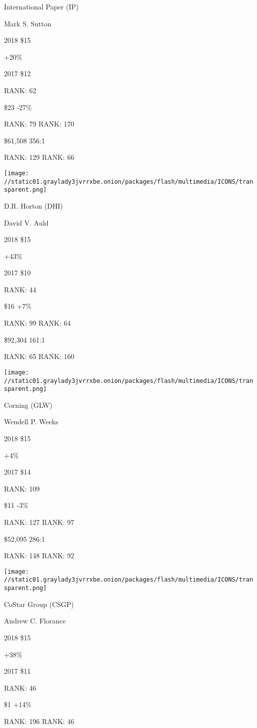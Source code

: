 International Paper (IP)

Mark S. Sutton \protect\hyperlink{g-footnotes}{}

2018 \$15

 +20\%

2017 \$12

RANK: 62

 \$23 -27\%

RANK: 79 RANK: 170

 \$61,508 356:1

RANK: 129 RANK: 66

\texttt{[image: //static01.graylady3jvrrxbe.onion/packages/flash/multimedia/ICONS/transparent.png]}

D.R. Horton (DHI)

David V. Auld \protect\hyperlink{g-footnotes}{}

2018 \$15

 +43\%

2017 \$10

RANK: 44

 \$16 +7\%

RANK: 99 RANK: 64

 \$92,304 161:1

RANK: 65 RANK: 160

\texttt{[image: //static01.graylady3jvrrxbe.onion/packages/flash/multimedia/ICONS/transparent.png]}

Corning (GLW)

Wendell P. Weeks \protect\hyperlink{g-footnotes}{}

2018 \$15

 +4\%

2017 \$14

RANK: 109

 \$11 -3\%

RANK: 127 RANK: 97

 \$52,095 286:1

RANK: 148 RANK: 92

\texttt{[image: //static01.graylady3jvrrxbe.onion/packages/flash/multimedia/ICONS/transparent.png]}

CoStar Group (CSGP)

Andrew C. Florance \protect\hyperlink{g-footnotes}{}

2018 \$15

 +38\%

2017 \$11

RANK: 46

 \$1 +14\%

RANK: 196 RANK: 46

